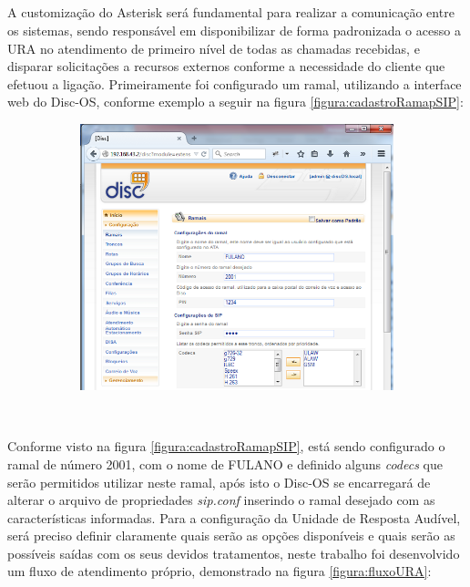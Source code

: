 \subsection{\fontsize{12}{1} }

A customização do Asterisk será fundamental para realizar a comunicação entre os sistemas, sendo responsável em disponibilizar de forma padronizada o acesso a URA no atendimento de primeiro nível de todas as chamadas recebidas, e disparar solicitações a recursos externos conforme a necessidade do cliente que efetuou a ligação.
Primeiramente foi configurado um ramal, utilizando a interface web do Disc-OS, conforme exemplo a seguir na figura \ref{figura:cadastroRamapSIP}:


\begin{figure}[H]
	\centering
	\caption{\textbf{Cadastro de um Ramal SIP.}}	
	\label{figura:cadastroRamapSIP}
		\begin{subfigure}[H]{\textwidth}
			\centering
			\includegraphics{figuras/cadastro_ramal_sip.png}
		\end{subfigure}
	\\[6pt]
	\fontsize{10}{12}\selectfont {Fonte: Autoria Própria.}
\end{figure}


Conforme visto na figura \ref{figura:cadastroRamapSIP}, está sendo configurado o ramal de número 2001, com o nome de FULANO e definido alguns \textit{codecs} que serão permitidos utilizar neste ramal, após isto o Disc-OS se encarregará de alterar o arquivo de propriedades \textit{sip.conf} inserindo o ramal desejado com as características informadas.
Para a configuração da Unidade de Resposta Audível, será preciso definir claramente quais serão as opções disponíveis e quais serão as possíveis saídas com os seus devidos tratamentos, neste trabalho foi desenvolvido um fluxo de atendimento próprio, demonstrado na figura \ref{figura:fluxoURA}: 

